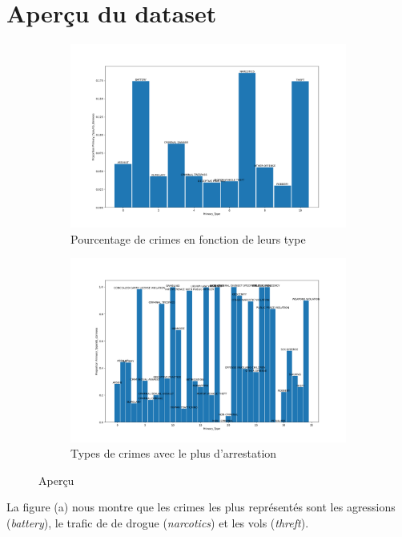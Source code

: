 \documentclass{article}
\begin{document}
    \section{Aperçu du dataset}
    \begin{figure}[H]
	    \centering
	    \begin{subfigure}{.45\textwidth}
		    \includegraphics[scale=.2]{images/pprimarytype.png}
		    \caption{Pourcentage de crimes en fonction de leurs type}
	    \end{subfigure}
	    \begin{subfigure}{.45\textwidth}
		    \includegraphics[scale=.2]{images/typeArrestation.png}
		    \caption{Types de crimes avec le plus d'arrestation}
	    \end{subfigure}
	    \caption{Aperçu }
    \end{figure}
    La figure (a) nous montre que les crimes les plus représentés sont les 
    agressions (\textit{battery}), le trafic de de drogue (\textit{narcotics}) 
    et les vols (\textit{threft}).
\end{document}
